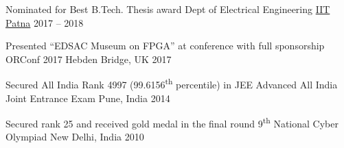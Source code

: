 \begin{cvhonours}


\cvhonour
	{Nominated for Best B.Tech. Thesis award} %
	{Dept of Electrical Engineering} %
	{\href{https://www.iitp.ac.in}{IIT Patna}} %
	{2017 -- 2018} %

\cvhonour
	{Presented ``EDSAC Museum on FPGA'' at conference with full sponsorship} %
	{ORConf 2017} %
	{Hebden Bridge, UK} %
	{2017} %

\cvhonour
	{Secured All India Rank 4997 (99.6156\textsuperscript{th} percentile) in JEE Advanced} %
	{All India Joint Entrance Exam} %
	{Pune, India} %
	{2014} %


\cvhonour
	{Secured rank 25 and received gold medal in the final round} %
	{9\textsuperscript{th} National Cyber Olympiad} %
	{New Delhi, India} %
	{2010} %



\end{cvhonours}